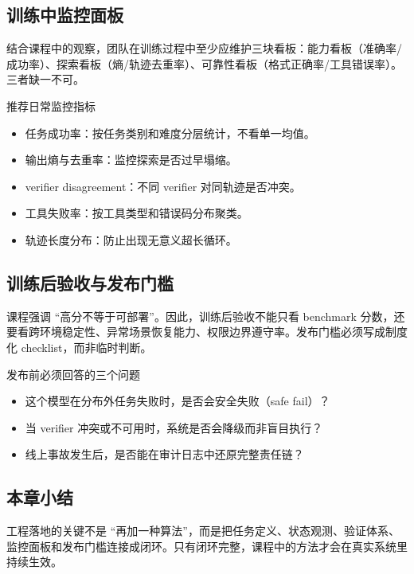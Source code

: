 \subsection{训练中监控面板}
结合课程中的观察，团队在训练过程中至少应维护三块看板：能力看板（准确率/成功率）、探索看板（熵/轨迹去重率）、可靠性看板（格式正确率/工具错误率）。三者缺一不可。

\begin{knowledgebox}{推荐日常监控指标}
\begin{itemize}
    \item 任务成功率：按任务类别和难度分层统计，不看单一均值。
    \item 输出熵与去重率：监控探索是否过早塌缩。
    \item verifier disagreement：不同 verifier 对同轨迹是否冲突。
    \item 工具失败率：按工具类型和错误码分布聚类。
    \item 轨迹长度分布：防止出现无意义超长循环。
\end{itemize}
\end{knowledgebox}

\subsection{训练后验收与发布门槛}
课程强调 ``高分不等于可部署''。因此，训练后验收不能只看 benchmark 分数，还要看跨环境稳定性、异常场景恢复能力、权限边界遵守率。发布门槛必须写成制度化 checklist，而非临时判断。

\begin{warningbox}{发布前必须回答的三个问题}
\begin{itemize}
    \item 这个模型在分布外任务失败时，是否会安全失败（safe fail）？
    \item 当 verifier 冲突或不可用时，系统是否会降级而非盲目执行？
    \item 线上事故发生后，是否能在审计日志中还原完整责任链？
\end{itemize}
\end{warningbox}

\subsection{本章小结}
工程落地的关键不是 ``再加一种算法''，而是把任务定义、状态观测、验证体系、监控面板和发布门槛连接成闭环。只有闭环完整，课程中的方法才会在真实系统里持续生效。

